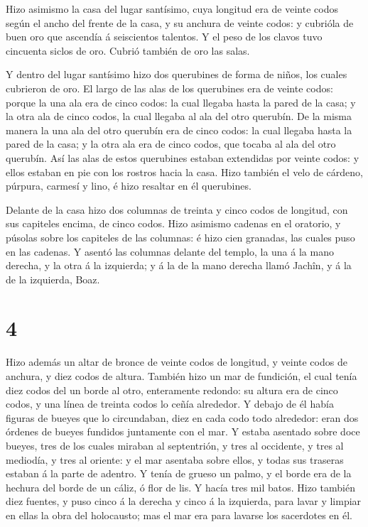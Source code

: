  Hizo asimismo la casa del lugar santísimo, cuya longitud
era de veinte codos según el ancho del frente de la casa, y su anchura
de veinte codos: y cubrióla de buen oro que ascendía á seiscientos
talentos.  Y el peso de los clavos tuvo cincuenta siclos de
oro. Cubrió también de oro las salas.

 Y dentro del lugar santísimo hizo dos querubines de forma
de niños, los cuales cubrieron de oro.  El largo de las
alas de los querubines era de veinte codos: porque la una ala era de
cinco codos: la cual llegaba hasta la pared de la casa; y la otra ala de
cinco codos, la cual llegaba al ala del otro querubín.  De
la misma manera la una ala del otro querubín era de cinco codos: la cual
llegaba hasta la pared de la casa; y la otra ala era de cinco codos, que
tocaba al ala del otro querubín.  Así las alas de estos
querubines estaban extendidas por veinte codos: y ellos estaban en pie
con los rostros hacia la casa.  Hizo también el velo de
cárdeno, púrpura, carmesí y lino, é hizo resaltar en él querubines.

 Delante de la casa hizo dos columnas de treinta y cinco
codos de longitud, con sus capiteles encima, de cinco codos.
 Hizo asimismo cadenas en el oratorio, y púsolas sobre los
capiteles de las columnas: é hizo cien granadas, las cuales puso en las
cadenas.  Y asentó las columnas delante del templo, la una
á la mano derecha, y la otra á la izquierda; y á la de la mano derecha
llamó Jachîn, y á la de la izquierda, Boaz.

\hypertarget{section-3}{%
\section{4}\label{section-3}}

 Hizo además un altar de bronce de veinte codos de longitud,
y veinte codos de anchura, y diez codos de altura.  También
hizo un mar de fundición, el cual tenía diez codos del un borde al otro,
enteramente redondo: su altura era de cinco codos, y una línea de
treinta codos lo ceñía alrededor.  Y debajo de él había
figuras de bueyes que lo circundaban, diez en cada codo todo alrededor:
eran dos órdenes de bueyes fundidos juntamente con el mar. 
Y estaba asentado sobre doce bueyes, tres de los cuales miraban al
septentrión, y tres al occidente, y tres al mediodía, y tres al oriente:
y el mar asentaba sobre ellos, y todas sus traseras estaban á la parte
de adentro.  Y tenía de grueso un palmo, y el borde era de
la hechura del borde de un cáliz, ó flor de lis. Y hacía tres mil batos.
 Hizo también diez fuentes, y puso cinco á la derecha y
cinco á la izquierda, para lavar y limpiar en ellas la obra del
holocausto; mas el mar era para lavarse los sacerdotes en él.

